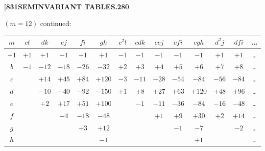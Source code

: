 \documentclass[11pt,a4paper]{book}
\begin{document}
\newpage
\setcounter{page}{280}

\noindent\textbf{[831}\hfill\textbf{SEMINVARIANT TABLES.}\hfill\textbf{280}

\bigskip

\noindent $(m = 12)$ continued:
\begin{center}
\small
\begin{tabular}{|c|c|c|c|c|c|c|c|c|c|c|c|c|c|}
\hline
$m$ & $cl$ & $dk$ & $ej$ & $fi$ & $gh$ & $c^2l$ & $cdk$ & $cej$ & $cfi$ & $cgh$ & $d^2j$ & $dfi$ & \dots \\
\hline
$+1$ & $+1$ & $+1$ & $+1$ & $+1$ & $+1$ & $-1$ & $-1$ & $-1$ & $-1$ & $-1$ & $+1$ & $+1$ & \dots \\
$b$ & $-1$ & $-12$ & $-18$ & $-26$ & $-32$ & $+2$ & $+3$ & $+4$ & $+5$ & $+6$ & $+7$ & $+8$ & \dots \\
$c$ & & $+14$ & $+45$ & $+84$ & $+120$ & $-3$ & $-11$ & $-28$ & $-54$ & $-84$ & $-56$ & $-84$ & \dots \\
$d$ & & $-10$ & $-40$ & $-92$ & $-150$ & $+1$ & $+8$ & $+27$ & $+63$ & $+120$ & $+48$ & $+96$ & \dots \\
$e$ & & $+2$ & $+17$ & $+51$ & $+100$ & & $-1$ & $-11$ & $-36$ & $-84$ & $-16$ & $-48$ & \dots \\
$f$ & & & $-4$ & $-18$ & $-48$ & & & $+1$ & $+9$ & $+30$ & $+2$ & $+14$ & \dots \\
$g$ & & & & $+3$ & $+12$ & & & & $-1$ & $-7$ & & $-2$ & \dots \\
$h$ & & & & & $-1$ & & & & & $+1$ & & & \dots \\
\hline
\end{tabular}
\end{center}

\medskip

\clearpage


\setcounter{page}{301}

\end{document}
